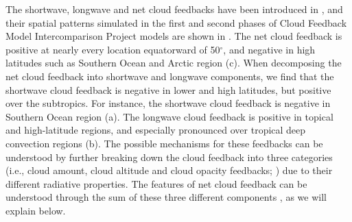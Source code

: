 The shortwave, longwave and net cloud feedbacks have been introduced in , and their spatial patterns simulated in the first and second phases of Cloud Feedback Model Intercomparison Project \citep[CFMIP;][]{Webb2017cfmip} models are shown in . The net cloud feedback is positive at nearly every location equatorward of 50$^\circ$, and negative in high latitudes such as Southern Ocean and Arctic region (c). When decomposing the net cloud feedback into shortwave and longwave components, we find that the shortwave cloud feedback is negative in lower and high latitudes, but positive over the subtropics. For instance, the shortwave cloud feedback is negative in Southern Ocean region (a). The longwave cloud feedback is positive in topical and high-latitude regions, and especially pronounced over tropical deep convection regions (b). The possible mechanisms for these feedbacks can be understood by further breaking down the cloud feedback into three categories (i.e., cloud amount, cloud altitude and cloud opacity feedbacks; \citealt{Zelinka2012computing2}) due to their different radiative properties. The features of net cloud feedback can be understood through the sum of these three different components \citep{Ceppi2017,Zelinka2017}, as we will explain below. %


